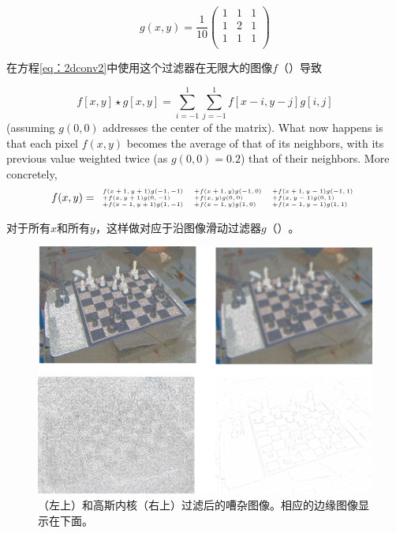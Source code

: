 \begin{equation}
g(x,y)=\frac{1}{10}
\left(
\begin{array}{ccc}
1 & 1 & 1\\
1 & 2 & 1\\
1 & 1 & 1\\
\end{array}
\right)
\end{equation}


在方程\ref{eq：2dconv2}中使用这个过滤器在无限大的图像$f（）$导致

\begin{equation}\label{eq:2dconv3}
f[x,y]\star g[x,y]=\sum_{i=-1}^{1}\sum_{j=-1}^{1}f[x-i,y-j]g[i,j]
\end{equation}
(assuming $g(0,0)$ addresses the center of the matrix). What now happens is that each pixel $f(x,y)$ becomes the average of that of its neighbors, with its previous value weighted twice (as $g(0,0)=0.2$) that of their neighbors. More concretely,
\begin{equation}
\tiny
f(x,y)=
\begin{array}{lll}
f(x+1,y+1)g(-1,-1) &+f(x+1,y)g(-1,0) &+f(x+1,y-1)g(-1,1)\\
+f(x,y+1)g(0,-1) &+f(x,y)g(0,0) &+f(x,y-1)g(0,1)\\
+f(x-1,y+1)g(1,-1) &+f(x-1,y)g(1,0) &+f(x-1,y-1)g(1,1)
\end{array}
\end{equation}


对于所有$ x $和所有$ y $，这样做对应于沿图像滑动过滤器$ g（）$。

\begin{figure}
	\centering
		\includegraphics[width=\textwidth]{figs/filters}
	\caption{（左上）和高斯内核（右上）过滤后的嘈杂图像。相应的边缘图像显示在下面。 
	\label{fig:filters}}
\end{figure}

